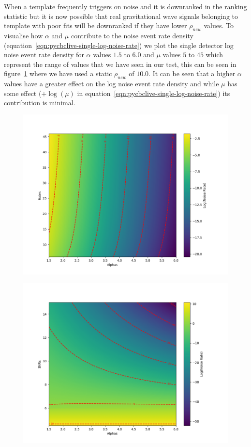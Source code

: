 When a template frequently triggers on noise and it is downranked in the ranking statistic but it is now possible that real gravitational wave signals belonging to template with poor fits will be downranked if they have lower $\rho_{new}$ values. To visualise how $\alpha$ and $\mu$ contribute to the noise event rate density (equation~\ref{eqn:pycbclive-single-log-noise-rate}) we plot the single detector log noise event rate density for $\alpha$ values $1.5$ to $6.0$ and $\mu$ values $5$ to $45$ which represent the range of values that we have seen in our test, this can be seen in figure~\ref{fig:pycbclive-log-noise-static-snr} where we have used a static $\rho_{new}$ of $10.0$. It can be seen that a higher $\alpha$ values have a greater effect on the log noise event rate density and while $\mu$ has some effect ($ + \log(\mu)$ in equation~\ref{eqn:pycbclive-single-log-noise-rate}) its contribution is minimal.
%
\begin{figure}
    \centering
    \includegraphics[width=1\textwidth]{images/5_pycbclive/lognoise_alpha_rate.png}
    \caption{}
    \label{fig:pycbclive-log-noise-static-snr}
\end{figure}
%
\begin{figure}
    \centering
    \includegraphics[width=1\textwidth]{images/5_pycbclive/lognoise_alpha_snr.png}
    \caption{}
    \label{fig:pycbclive-log-noise-static-rate}
\end{figure}
